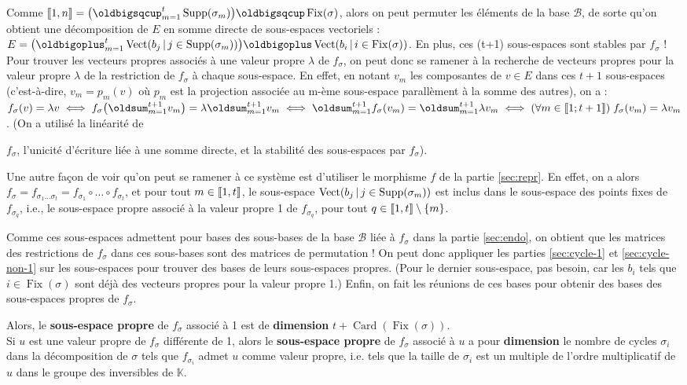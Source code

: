 \documentclass[10pt,a4paper,french,landscape]{article}
\DeclarePairedDelimiter\parenlong{\lparen}{\rparen}
\newcommand{\paren}[1]{\parenlong*{#1}}
\DeclarePairedDelimiter\bracketlong{\llbracket}{\rrbracket}
\newcommand{\br}[1]{\bracketlong*{#1}}
\renewcommand{\sum}{\displaystyle\oldsum}
\renewcommand{\bigoplus}{\displaystyle\oldbigoplus}
\renewcommand{\bigsqcup}{\displaystyle\oldbigsqcup}
\theoremstyle{definition}
\theoremstyle{remark}
\DeclareMathOperator{\Card}{Card}
\DeclareMathOperator{\Fix}{Fix}
\DeclareMathOperator{\Vect}{Vect}
\DeclareMathOperator{\Supp}{Supp}
\newcommand{\KK}{\mathbb K}
\newcommand{\1}{\mathbbm{1}}
\newcommand{\ba}[1]{\mathcal{#1}}
\begin{document}
\begin{multicols*}{2}
Comme $\br{1,n}=\paren{\bigsqcup_{m=1}^t\Supp(\sigma_m)}\bigsqcup\Fix(\sigma)$, alors on peut permuter les éléments de la base $\ba{B}$, de sorte qu'on obtient une décomposition de $E$ en somme directe de sous-espaces vectoriels :
$E=\paren{\bigoplus_{m=1}^t\Vect\paren{b_j\,|\,j\in\Supp(\sigma_m)}}\bigoplus\Vect\paren{b_i\,|\,i\in\Fix(\sigma)}$. En plus, ces (t+1) sous-espaces sont stables par $f_\sigma$ ! Pour trouver les vecteurs propres associés à une valeur propre $\lambda$ de $f_\sigma$, on peut donc se ramener à la recherche de vecteurs propres pour la valeur propre $\lambda$ de la restriction de $f_\sigma$ à chaque sous-espace. En effet, en notant $v_m$ les composantes de $v\in E$ dans ces $t+1$ sous-espaces (c'est-à-dire, $v_m=p_m(v)$ où $p_m$ est la projection associée au m-ème sous-espace parallèment à la somme des autres), on a :
${f_\sigma(v)=\lambda v}
\iff {f_\sigma\paren{\sum_{m=1}^{t+1}v_m}=\lambda \sum_{m=1}^{t+1}v_m}
\iff {\sum_{m=1}^{t+1}f_\sigma\paren{v_m}=\sum_{m=1}^{t+1}\lambda v_m}
\iff {(\forall m\in\br{1;t+1})\;f_\sigma\paren{v_m}=\lambda v_m}$. (On a utilisé la linéarité de\smallskip

\noindent
$f_\sigma$, l'unicité d'écriture liée à une somme directe, et la stabilité des sous-espaces par $f_\sigma$).\medskip

Une autre façon de voir qu'on peut se ramener à ce système est d'utiliser le morphisme $f$ de la partie \ref{sec:repr}. En effet, on a alors $f_\sigma=f_{\sigma_1\dots\sigma_t}=f_{\sigma_1}\circ\dots\circ f_{\sigma_t}$, et pour tout $m\in\br{1,t}$, le sous-espace $\Vect\paren{b_j\,|\,j\in\Supp(\sigma_m)}$ est inclus dans le sous-espace des points fixes de $f_{\sigma_q}$, i.e., le sous-espace propre associé à la valeur propre 1 de $f_{\sigma_q}$, pour tout $q\in\br{1,t}\setminus\{m\}$.\medskip

Comme ces sous-espaces admettent pour bases des sous-bases de la base $\ba{B}$ liée à $f_\sigma$ dans la partie \ref{sec:endo}, on obtient que les matrices des restrictions de $f_\sigma$ dans ces sous-bases sont des matrices de permutation ! On peut donc appliquer les parties \ref{sec:cycle-1} et \ref{sec:cycle-non-1} sur les sous-espaces pour trouver des bases de leurs sous-espaces propres. (Pour le dernier sous-espace, pas besoin, car les $b_i$ tels que $i\in\Fix(\sigma)$ sont déjà des vecteurs propres pour la valeur propre 1.)
Enfin, on fait les réunions de ces bases pour obtenir des bases des sous-espaces propres de $f_\sigma$.

Alors, le \textbf{sous-espace propre} de $f_\sigma$ associé à 1 est de \textbf{dimension} $t+\Card(\Fix(\sigma))$.\\
Si $u$ est une valeur propre de $f_\sigma$ différente de 1, alors le \textbf{sous-espace propre} de $f_\sigma$ associé à $u$ a pour \textbf{dimension} le nombre de cycles $\sigma_i$ dans la décomposition de $\sigma$ tels que $f_{\sigma_i}$ admet $u$ comme valeur propre, i.e. tels que la taille de $\sigma_i$ est un multiple de l'ordre multiplicatif de $u$ dans le groupe des inversibles de $\KK$.


\end{multicols*}
\end{document}
